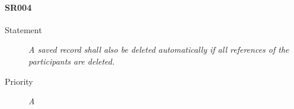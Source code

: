 \paragraph{SR004}
  \begin{description}
  \item [Statement] 
    \textit{ A saved record shall also be deleted automatically if all references of the participants are deleted.}
  \item [Priority] \textit{A}
\end{description}
